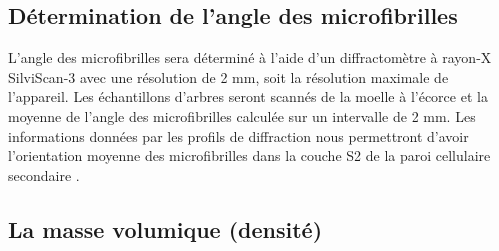 \documentclass[a4paper,12pt]{report}
\begin{document}
\subsection*{Détermination de l'angle des microfibrilles}
L'angle des microfibrilles sera déterminé à l'aide d'un diffractomètre à rayon-X SilviScan-3 avec une résolution de 2 mm, soit la résolution maximale de l'appareil. Les échantillons d'arbres seront scannés de la moelle à l'écorce et la moyenne de l'angle des microfibrilles calculée sur un intervalle de 2 mm.
Les informations données par les profils de diffraction nous permettront d'avoir l'orientation moyenne des microfibrilles dans la couche S2 de la paroi cellulaire secondaire \citep{Evans1999}.

\subsection*{La masse volumique (densité)}
\end{document}
